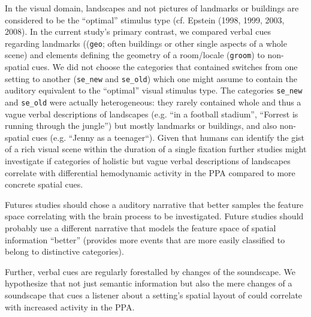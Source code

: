 \documentclass[english]{article}
\begin{document}
In the visual domain, landscapes and not pictures of landmarks or buildings are
considered to be the ``optimal'' stimulus type (cf. Epstein (1998, 1999, 2003,
2008).
In the current study's primary contrast, we compared verbal cues regarding
landmarks ((\texttt{geo}; often buildings or other single aspects of a whole
scene) and elements defining the geometry of a room/locale (\texttt{groom}) to
non-spatial cues.
We did not choose the categories that contained switches from one setting to
another (\texttt{se\_new} and \texttt{se\_old}) which one might assume to
contain the auditory equivalent to the ``optimal'' visual stimulus type.
The categories \texttt{se\_new} and \texttt{se\_old} were actually
heterogeneous: they rarely contained whole and thus a vague verbal descriptions
of landscapes (e.g. ``in a football stadium'', ``Forrest is running through the
jungle'') but mostly landmarks or buildings, and also non-spatial
cues (e.g. ``Jenny as a teenager``).
Given that humans can identify the gist of a rich visual scene within the
duration of a single fixation \citep{henderson2003human} further studies might
investigate if categories of holistic but vague verbal descriptions of
landscapes correlate with differential hemodynamic activity in the PPA compared
to more concrete spatial cues.

Futures studies should chose a auditory narrative that better samples the
feature space correlating with the brain process to be investigated.
Future studies should probably use a different narrative that models the feature
space of spatial information ``better'' (provides more events that are more
easily classified to belong to distinctive categories).

Further, verbal cues are regularly forestalled by changes of the soundscape.
We hypothesize that not just semantic information but also the mere changes of a
soundscape that cues a listener about a setting's spatial layout of could
correlate with increased activity in the PPA.
\end{document}
